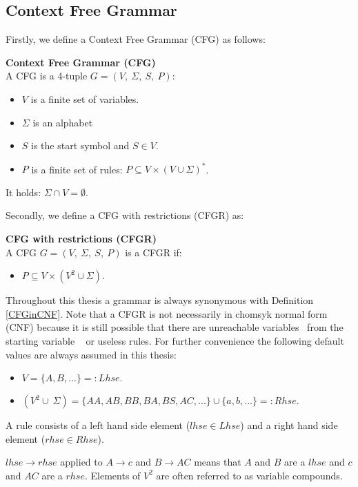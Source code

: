 \subsection{Context Free Grammar} \label{cfgChapter}
Firstly, we define a Context Free Grammar (CFG) as follows:
\begin{DefGrey} \textbf{Context Free Grammar (CFG)}\\
	A CFG is a 4-tuple $G=(V,\ \Sigma,\ S,\ P)$:
	\begin{itemize}
		\item $V$ is a finite set of variables.
		\item $\Sigma$ is an alphabet
		\item $S$ is the start symbol and $S \in V$.
		\item $P$ is a finite set of rules: $P \subseteq V \times (V \cup \Sigma)^{*}$.
	\end{itemize}
	It holds: $\Sigma \cap V =  \emptyset$.
\end{DefGrey}
\noindent Secondly, we define a CFG with restrictions (CFGR) as:
\begin{DefGrey}\label{CFGinCNF} \textbf{CFG with restrictions (CFGR)}\\
	A CFG $G=(V,\ \Sigma,\ S,\ P)$ is a CFGR if:
	\begin{itemize}
		\item $P \subseteq V \times (V^2 \cup \Sigma)$.~
	\end{itemize}
\end{DefGrey}
\noindent Throughout this thesis a grammar is always synonymous with Definition \ref{CFGinCNF}. Note that a CFGR is not necessarily in chomsyk normal form (CNF) because it is still possible that there are unreachable variables \textendash~from the starting variable \textendash~ or useless rules. For further convenience the following default values are always assumed in this thesis:
\begin{itemize}
	\item $V = \{A, B, ...\}=:Lhse.$
	\item $(V^2 \cup\ \Sigma)=\{AA, AB, BB, BA, BS, AC, ... \} \cup \{a, b, ...\}=:Rhse.$
\end{itemize}
A rule consists of a left hand side element ($lhse \in Lhse$) and a right hand side element ($rhse \in Rhse$). \\
\begin{testexample}
	$lhse \longrightarrow rhse$ applied to $A \longrightarrow c$ and $B \longrightarrow AC$ means that $A$ and $B$ are a $lhse$ and $c$ and $AC$ are a $rhse$. Elements of $V^2$ are often referred to as variable compounds.
\end{testexample}~\\
